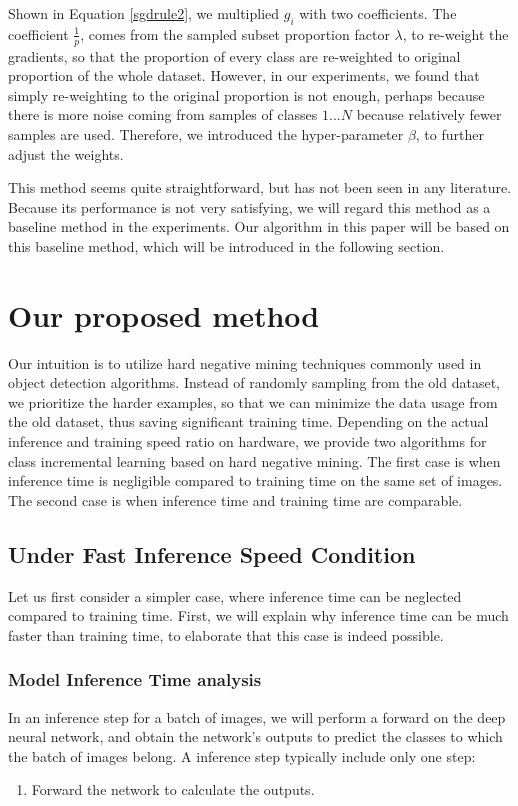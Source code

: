 Shown in Equation \ref{sgdrule2}, we multiplied $g_i$ with two coefficients. The coefficient $\frac{1}{p}$, comes from the sampled subset proportion factor $\lambda$, to re-weight the gradients, so that the proportion of every class are re-weighted to original proportion of the whole dataset. However, in our experiments, we found that simply re-weighting to the original proportion is not enough, perhaps because there is more noise coming from samples of classes $1...N$ because relatively fewer samples are used. Therefore, we introduced the hyper-parameter $\beta$, to further adjust the weights.

This method seems quite straightforward, but has not been seen in any literature. Because its performance is not very satisfying, we will regard this method as a baseline method in the experiments. Our algorithm in this paper will be based on this baseline method, which will be introduced in the following section.
\label{baselinesection}

\section{Our proposed method}

Our intuition is to utilize hard negative mining techniques commonly used in object detection algorithms. Instead of randomly sampling from the old dataset, we prioritize the harder examples, so that we can minimize the data usage from the old dataset, thus saving significant training time. Depending on the actual inference and training speed ratio on hardware, we provide two algorithms for class incremental learning based on hard negative mining. The first case is when inference time is negligible compared to training time on the same set of images. The second case is when inference time and training time are comparable.

\subsection{Under Fast Inference Speed Condition}
Let us first consider a simpler case, where inference time can be neglected compared to training time. First, we will explain why inference time can be much faster than training time, to elaborate that this case is indeed possible.
\subsubsection{Model Inference Time analysis}
In an inference step for a batch of images, we will perform a forward on the deep neural network, and obtain the network's outputs to predict the classes to which the batch of images belong. A inference step typically include only one step:
\begin{enumerate}
	\item  Forward the network to calculate the outputs.
\end{enumerate}

